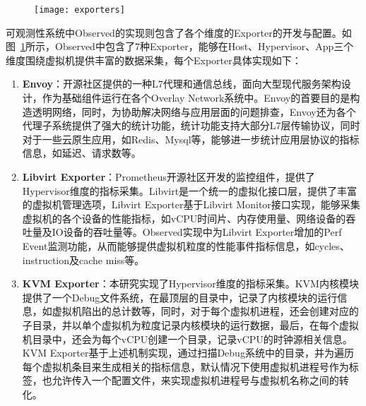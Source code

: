 \begin{figure}[!htbp]
    \centering
    \texttt{[image: exporters]}
    \label{fig:exporters} 
\end{figure}

可观测性系统中Observed的实现则包含了各个维度的Exporter的开发与配置。如图~\ref{fig:exporters}所示，Observed中包含了7种Exporter，能够在Host、Hypervisor、App三个维度围绕虚拟机提供丰富的数据采集，每个Exporter具体实现如下：

\begin{enumerate}
    \item \textbf{Envoy}：开源社区提供的一种L7代理和通信总线，面向大型现代服务架构设计，作为基础组件运行在各个Overlay Network系统中。Envoy的首要目的是构造透明网络，同时，为协助解决网络与应用层面的问题排查，Envoy还为各个代理子系统提供了强大的统计功能，统计功能支持大部分L7层传输协议，同时对于一些云原生应用，如Redis、Mysql等，能够进一步统计应用层协议的指标信息，如延迟、请求数等。
    
    \item \textbf{Libvirt Exporter}：Prometheus开源社区开发的监控组件，提供了Hypervisor维度的指标采集。Libvirt是一个统一的虚拟化接口层，提供了丰富的虚拟机管理选项，Libvirt Exporter基于Libvirt Monitor接口实现，能够采集虚拟机的各个设备的性能指标，如vCPU时间片、内存使用量、网络设备的吞吐量及IO设备的吞吐量等。Observed实现中为Libvirt Exporter增加的Perf Event监测功能，从而能够提供虚拟机粒度的性能事件指标信息，如cycles、instruction及cache miss等。
    
    \item \textbf{KVM Exporter}：本研究实现了Hypervisor维度的指标采集。KVM内核模块提供了一个Debug文件系统，在最顶层的目录中，记录了内核模块的运行信息，如虚拟机陷出的总计数等，同时，对于每个虚拟机进程，还会创建对应的子目录，并以单个虚拟机为粒度记录内核模块的运行数据，最后，在每个虚拟机目录中，还会为每个vCPU创建一个目录，记录vCPU的时钟源相关信息。KVM Exporter基于上述机制实现，通过扫描Debug系统中的目录，并为遍历每个虚拟机条目来生成相关的指标信息，默认情况下使用虚拟机进程号作为标签，也允许传入一个配置文件，来实现虚拟机进程号与虚拟机名称之间的转化。


\end{enumerate}
